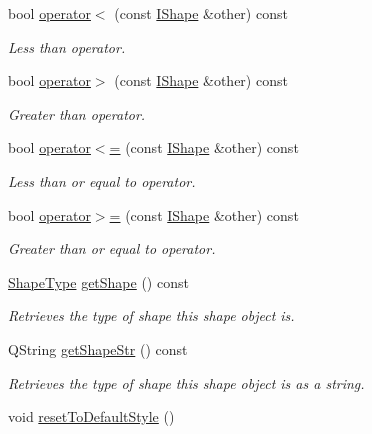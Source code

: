 \begin{DoxyCompactItemize}
bool \mbox{\hyperlink{class_i_shape_aea5cdca9613598dbfff8c7d2eb512cea}{operator$<$}} (const \mbox{\hyperlink{class_i_shape}{I\+Shape}} \&other) const
\begin{DoxyCompactList}\small\item\em Less than operator. \end{DoxyCompactList}\item 
bool \mbox{\hyperlink{class_i_shape_a95d2cf58e5264e4e4bf1af65a383760c}{operator$>$}} (const \mbox{\hyperlink{class_i_shape}{I\+Shape}} \&other) const
\begin{DoxyCompactList}\small\item\em Greater than operator. \end{DoxyCompactList}\item 
bool \mbox{\hyperlink{class_i_shape_a7cb22874dc0be6b43b79a94c88c3578a}{operator$<$=}} (const \mbox{\hyperlink{class_i_shape}{I\+Shape}} \&other) const
\begin{DoxyCompactList}\small\item\em Less than or equal to operator. \end{DoxyCompactList}\item 
bool \mbox{\hyperlink{class_i_shape_ac05b13d61818afc793cb0387703a0998}{operator$>$=}} (const \mbox{\hyperlink{class_i_shape}{I\+Shape}} \&other) const
\begin{DoxyCompactList}\small\item\em Greater than or equal to operator. \end{DoxyCompactList}\item 
\mbox{\hyperlink{class_i_shape_a8f50993477b5ddb44c0547ef3d547cdc}{Shape\+Type}} \mbox{\hyperlink{class_i_shape_a92764c3d0b0d12f0f1296cf1e3a392a8}{get\+Shape}} () const
\begin{DoxyCompactList}\small\item\em Retrieves the type of shape this shape object is. \end{DoxyCompactList}\item 
\mbox{\label{class_i_shape_a06242126083d206caa7c4a54da485eb3}} 
Q\+String \mbox{\hyperlink{class_i_shape_a06242126083d206caa7c4a54da485eb3}{get\+Shape\+Str}} () const
\begin{DoxyCompactList}\small\item\em Retrieves the type of shape this shape object is as a string. \end{DoxyCompactList}\item 
void \mbox{\hyperlink{class_i_shape_a3f1e70475296c2e897df28a7facb5bad}{reset\+To\+Default\+Style}} ()

\end{DoxyCompactItemize}
